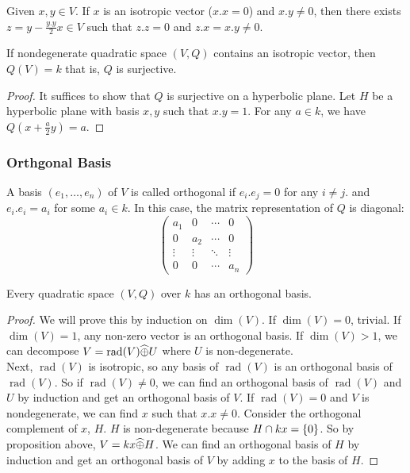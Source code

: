 \documentclass[15pt]{scrartcl}
\newcommand{\rad}{\operatorname{rad}}
\newcommand{\po}{\wh{\oplus}}
\begin{document}
\begin{lemma}
    Given $x,y\in V$. If $x$ is an isotropic vector ($x.x=0$) and $x.y\neq 0$, then there exists $z=y-\frac{y.y}{2}x\in V$ such that $z.z=0$ and $z.x=x.y\neq 0$. 
\end{lemma}
\begin{corollary}
    If nondegenerate quadratic space $(V,Q)$ contains an isotropic vector, then $Q(V)=k$ that is, $Q$ is surjective.
\end{corollary}
\begin{proof}
    It suffices to show that $Q$ is surjective on a hyperbolic plane. Let $H$ be a hyperbolic plane with basis $x,y$ such that $x.y=1$. For any $a\in k$, we have $Q(x+\frac{a}{2}y)=a$. 
\end{proof}
\subsubsection*{Orthgonal Basis}
A basis $(e_1,\ldots,e_n)$ of $V$ is called orthogonal if $e_i.e_j=0$ for any $i\neq j$. and $e_i.e_i=a_i$ for some $a_i\in k$. In this case, the matrix representation of $Q$ is diagonal: 
\[\begin{pmatrix}
    a_1 & 0 & \cdots & 0
    \\
    0 & a_2 & \cdots & 0
    \\
    \vdots & \vdots & \ddots & \vdots
    \\
    0 & 0 & \cdots & a_n
\end{pmatrix}\]
\begin{theorem}
    Every quadratic space $(V,Q)$ over $k$ has an orthogonal basis.
\end{theorem}
\begin{proof}
    We will prove this by induction on $\dim(V)$. If $\dim(V)=0$, trivial. If $\dim(V)=1$, any non-zero vector is an orthogonal basis. If $\dim(V)>1$, we can decompose $V=\rad(V)\po U$ where $U$ is non-degenerate. 
   \\

   Next, $\rad(V)$ is isotropic, so any basis of $\rad(V)$ is an orthogonal basis of $\rad(V)$. So if $\rad(V)\neq 0$, we can find an orthogonal basis of $\rad(V)$ and $U$ by induction and get an orthogonal basis of $V$. If $\rad(V)=0$ and $V$ is nondegenerate, we can find $x$ such that $x.x\neq 0$. Consider the orthogonal complement of $x$, $H$. $H$ is non-degenerate because $H\cap kx=\{0\}$. So by proposition above, $V=kx\po H$. We can find an orthogonal basis of $H$ by induction and get an orthogonal basis of $V$ by adding $x$ to the basis of $H$.
\end{proof}
\end{document}
